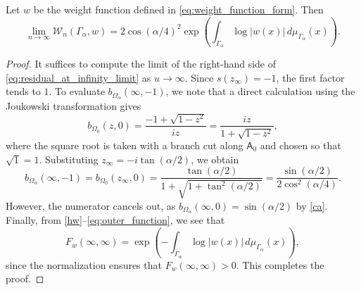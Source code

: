 \documentclass[10pt,a4paper]{amsart}
\newcommand{\cW}{{\mathcal{W}}}
\newcommand{\sfA}{\mathsf{A}}
\begin{document}
\begin{corollary}
Let $w$ be the weight function defined in \eqref{eq:weight_function_form}. Then 
\begin{equation}
   \lim_{n\rightarrow \infty}\cW_n(\Gamma_\alpha,w) = 
   2\cos(\alpha/4)^2\exp\left(\int_{\Gamma_\alpha} \log |w(x)|\,d\mu_{\Gamma_\alpha}(x)\right).
\end{equation}
\end{corollary}

\begin{proof}
It suffices to compute the limit of the right-hand side of \eqref{eq:residual_at_infinity_limit} as $u\to\infty$. Since $s(z_\infty)=-1$, the first factor tends to $1$. 
To evaluate $b_{\Omega_\alpha}(\infty, -1)$, we note that a direct calculation using the Joukowski transformation gives
\[
   b_{\Omega_0}(z,0)  = \frac{-1+\sqrt{1-z^2}}{iz} = \frac{iz}{1+\sqrt{1-z^2}},
\]
where the square root is taken with a branch cut along $\sfA_0$ and chosen so that $\sqrt{1}=1$.
Substituting $z_\infty = -i\tan(\alpha/2)$, we obtain
\[
   b_{\Omega_\alpha}(\infty, -1) = b_{\Omega_0}(z_\infty, 0) 
   = \frac{\tan(\alpha/2)}{1+\sqrt{1+\tan^2(\alpha/2)}} %
   = \frac{\sin(\alpha/2)}{2\cos^2(\alpha/4)}.
\]
However, the numerator cancels out, as $b_{\Omega_\alpha}(\infty, 0) = \sin(\alpha/2)$ by \eqref{ca}.
Finally, from \eqref{hw}--\eqref{eq:outer_function}, we see that 
\[
   F_w(\infty,\infty)=\exp\left(-\int_{\Gamma_\alpha} \log |w(x)|\,d\mu_{\Gamma_\alpha}(x)\right),
\]
since the normalization ensures that $F_w(\infty,\infty)>0$. This completes the proof.
\end{proof}
\end{document}
